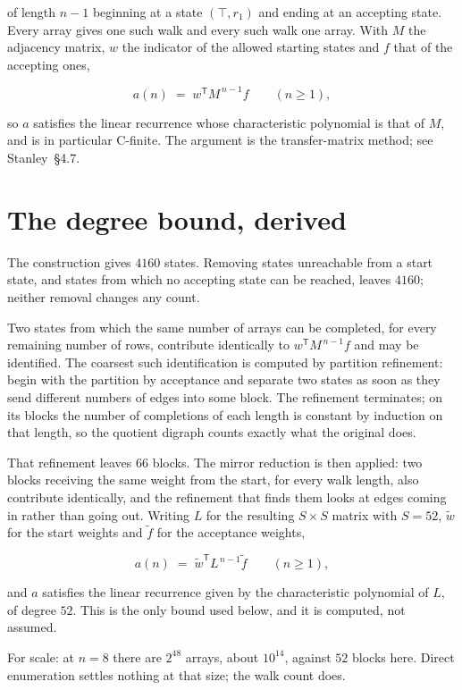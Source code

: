 \documentclass[11pt]{article}
\theoremstyle{definition}
\begin{document}
of length $n-1$ beginning at a state $(\top,r_1)$ and ending at an accepting state. Every array gives one such walk and every such walk one array. With $M$ the adjacency matrix, $w$ the indicator of the allowed starting states and $f$ that of the accepting ones,

\[a(n) \;=\; w^{\mathsf T} M^{\,n-1} f \qquad (n \ge 1),\]

so $a$ satisfies the linear recurrence whose characteristic polynomial is that of $M$, and is in particular C-finite. The argument is the transfer-matrix method; see Stanley~\S4.7.

\section{The degree bound, derived}

The construction gives $4160$ states. Removing states unreachable from a start state, and states from which no accepting state can be reached, leaves $4160$; neither removal changes any count.

Two states from which the same number of arrays can be completed, for every remaining number of rows, contribute identically to $w^{\mathsf T}M^{\,n-1}f$ and may be identified. The coarsest such identification is computed by partition refinement: begin with the partition by acceptance and separate two states as soon as they send different numbers of edges into some block. The refinement terminates; on its blocks the number of completions of each length is constant by induction on that length, so the quotient digraph counts exactly what the original does.

That refinement leaves $66$ blocks. The mirror reduction is then applied: two blocks receiving the same weight from the start, for every walk length, also contribute identically, and the refinement that finds them looks at edges coming in rather than going out. Writing $L$ for the resulting $S \times S$ matrix with $S = 52$, $\tilde w$ for the start weights and $\tilde f$ for the acceptance weights,

\[a(n) \;=\; \tilde w^{\mathsf T} L^{\,n-1} \tilde f \qquad (n \ge 1),\]

and $a$ satisfies the linear recurrence given by the characteristic polynomial of $L$, of degree $52$. This is the only bound used below, and it is computed, not assumed.

For scale: at $n = 8$ there are $2^{48}$ arrays, about $10^{14}$, against $52$ blocks here. Direct enumeration settles nothing at that size; the walk count does.
\end{document}
